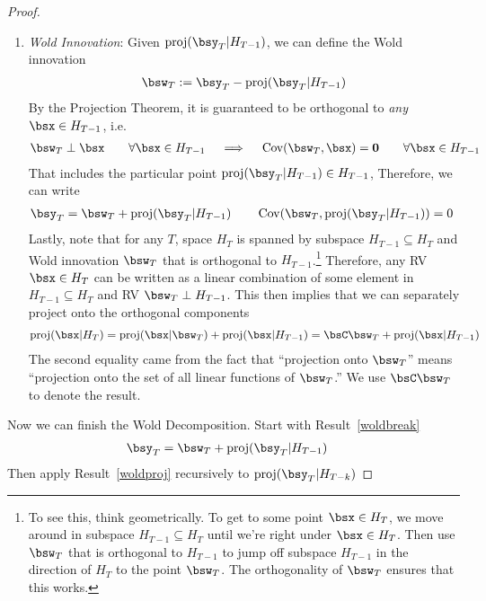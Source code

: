 \documentclass[12pt]{article}
\theoremstyle{plain}
\theoremstyle{definition}
\theoremstyle{remark}
\renewcommand{\bso}{\boldsymbol{0}}
\newcommand{\Cov}{\operatorname{Cov}}
\newcommand{\proj}{\operatorname{proj}}
\begin{document}
\begin{proof}
\begin{enumerate}[label=(\roman*)]
  \item
    \emph{Wold Innovation}:
    Given $\proj(\bsy_T|H_{T-1})$, we can define the Wold innovation
    \begin{align*}
      \bsw_T := \bsy_T - \proj(\bsy_T|H_{T-1})
    \end{align*}
    By the Projection Theorem, it is guaranteed to be orthogonal to
    \emph{any} $\bsx\in H_{T-1}$, i.e.
    \begin{align*}
      \bsw_T\perp \bsx \qquad \forall \bsx\in H_{T-1}
      \quad\implies\quad
      \Cov(\bsw_T,\bsx)=\bso
      \qquad
      \forall \bsx\in H_{T-1}
    \end{align*}
    That includes the particular point
    $\proj(\bsy_T|H_{T-1})\in H_{T-1}$,
    Therefore, we can write
    \begin{align}
      \bsy_T
      &= \bsw_T + \proj(\bsy_T|H_{T-1})
      \qquad
      \Cov(\bsw_T,\proj(\bsy_T|H_{T-1}))=0
      \label{woldbreak}
    \end{align}
    Lastly, note that for any $T$, space $H_{T}$ is spanned by subspace
    $H_{T-1}\subseteq H_T$ and Wold innovation $\bsw_{T}$ that is
    orthogonal to $H_{T-1}$.\footnote{%
      To see this, think geometrically.
      To get to some point $\bsx\in H_T$, we move around in subspace
      $H_{T-1}\subseteq H_T$ until we're right under $\bsx\in H_T$.
      Then use $\bsw_T$ that is orthogonal to $H_{T-1}$ to jump off
      subspace $H_{T-1}$ in the direction of $H_T$ to the point
      $\bsw_T$. The orthogonality of $\bsw_T$ ensures that this works.
    }
    Therefore, any RV $\bsx\in H_{T}$ can be written as a linear
    combination of some element in $H_{T-1}\subseteq H_{T}$ and RV
    $\bsw_T \perp H_{T-1}$.
    This then implies that we can separately project onto the orthogonal
    components
    \begin{align}
      \proj(\bsx|H_T)
      = \proj(\bsx|\bsw_T) + \proj(\bsx|H_{T-1})
      = \bsC\bsw_T + \proj(\bsx|H_{T-1})
      \label{woldproj}
    \end{align}
    The second equality came from the fact that ``projection onto
    $\bsw_T$'' means ``projection onto the set of all linear functions
    of $\bsw_T$.'' We use $\bsC\bsw_T$ to denote the result.
\end{enumerate}
Now we can finish the Wold Decomposition.
Start with Result~\ref{woldbreak}
\begin{align*}
    \bsy_T
    &= \bsw_T + \proj(\bsy_T|H_{T-1})
\end{align*}
Then apply Result~\ref{woldproj} recursively to $\proj(\bsy_T|H_{T-k})$

\end{proof}
\end{document}
